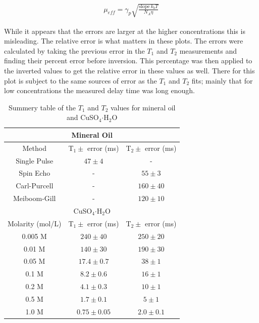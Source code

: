 \documentclass[
reprint,
amsmath,amssymb,
aps,
tikz,
border=5pt
]{revtex4-1}
\newcommand*{\cuso}[1][]{CuSO$_{4} \boldsymbol{\cdot} $H$_2$O }
\newcommand*{\tc}[1][1]{$T_#1$ }
\newcommand*{\tg}[1][2]{$T_#1$ }
\begin{document}
     \begin{gather}
        \mu_{eff} = \gamma_p \sqrt{\frac{\text{slope}~k_b T}{N_A \eta}} \label{eq:mageff}
     \end{gather}

     While it appears that the errors are larger at the higher concentrations this is misleading. The relative error is what matters in these plots. The errors were calculated by taking the previous error in the \tc and \tg measurements and finding their percent error before inversion. This percentage was then applied to the inverted values to get the relative error in these values as well. There for this plot is subject to the same sources of error as the \tc and \tg fits; mainly that for low concentrations the measured delay time was long enough. 




    \begin{table}[h]
    \begin{center}
    \begin{tabular}[b]{ |c|c|c| }
        \hline
        \multicolumn{3}{|c|}{Mineral Oil} \\ \hline
        Method & T$_1\pm$ error (ms) & T$_2\pm$ error (ms) \\ \hline
        Single Pulse & $47\pm 4$ & - \\ \hline 
        Spin Echo & - & $55\pm 3$ \\ \hline
        Carl-Purcell & - & $160\pm 40$ \\ \hline 
        Meiboom-Gill & - & $120\pm 10$ \\ \hline
        \multicolumn{3}{|c|}{CuSO$_{4} \boldsymbol{\cdot} $H$_2$O} \\ \hline
        Molarity (mol/L) & T$_1\pm$ error (ms) & T$_2\pm$ error (ms) \\ \hline
        0.005 M & $240\pm 40 $ & $250 \pm 20$ \\ \hline 
        0.01 M & $140 \pm 30$ & $190 \pm 30$ \\ \hline
        0.05 M & $17.4 \pm 0.7 $ & $ 38 \pm 1$ \\ \hline 
        0.1 M & $8.2 \pm 0.6$ & $16 \pm 1$ \\ \hline
        0.2 M & $4.1 \pm 0.3$ & $10 \pm 1$ \\ \hline 
        0.5 M & $1.7 \pm 0.1$ & $5 \pm 1$ \\ \hline
        1.0 M & $0.75 \pm 0.05$ & $2.0 \pm 0.1$ \\ \hline 
    \end{tabular}
        
        \caption{Summery table of the $T_1$ and $T_2$ values for mineral oil and \cuso}
        \label{tab:summery}
    \end{center}
    \end{table}
  
\end{document}
